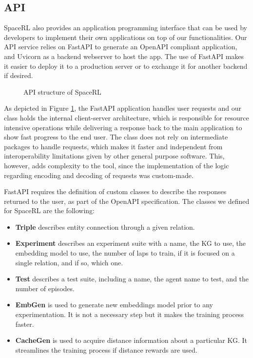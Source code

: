 \subsection{API}
SpaceRL also provides an application programming interface that can be used by developers to implement their own applications on top of our functionalities. Our API service relies on FastAPI\cite{FastAPI} to generate an OpenAPI \cite{OpenAPI} compliant application, and Uvicorn  \cite{Uvicorn} as a backend webserver to host the app. The use of FastAPI makes it easier to deploy it to a production server or to exchange it for another backend if desired.

\begin{figure}[!h]
    \centering
    
    \caption{API structure of SpaceRL}
    \label{fig:API_structure}
\end{figure}

As depicted in Figure \ref{fig:API_structure}, the FastAPI application handles user requests and our  class holds the internal client-server architecture, which is responsible for resource intensive operations while delivering a response back to the main application to show fast progress to the end user. The   class does not rely on intermediate packages to handle requests, which makes it faster and independent from interoperability limitations given by other general purpose software. This, however, adds complexity to the tool, since the implementation of the logic regarding encoding and decoding of requests was custom-made.

FastAPI requires the definition of custom classes to describe the responses returned to the user, as part of the OpenAPI specification. The classes we defined for SpaceRL are the following:

\begin{itemize}
    \item \textbf{Triple} describes entity connection through a given relation.
    \item \textbf{Experiment} describes an experiment suite with a name, the KG to use, the embedding model to use, the number of laps to train, if it is focused on a single relation, and if so, which one.
    \item \textbf{Test} describes a test suite, including a name, the agent name to test, and the number of episodes.
    \item \textbf{EmbGen} is used to generate new embeddings model prior to any experimentation. It is not a necessary step but it makes the training process faster.
    \item \textbf{CacheGen} is used to acquire distance information about a particular KG. It streamlines the training process if distance rewards are used.
\end{itemize}

